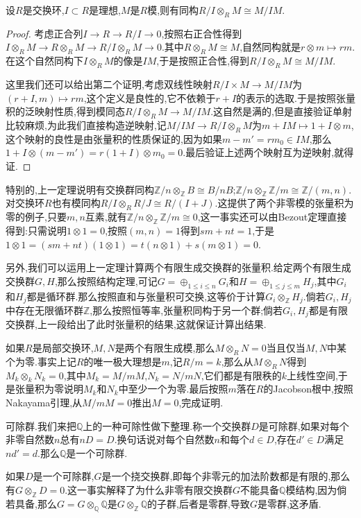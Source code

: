 设$R$是交换环,$I\subset R$是理想,$M$是$R$模,则有同构$R/I\otimes_RM\cong M/IM$.
\begin{proof}
	
	考虑正合列$I\to R\to R/I\to0$,按照右正合性得到$I\otimes_RM\to R\otimes_RM\to R/I\otimes_RM\to0$.其中$R\otimes_RM\cong M$,自然同构就是$r\otimes m\mapsto rm$.在这个自然同构下$I\otimes_RM$的像是$IM$,于是按照正合性,得到$R/I\otimes_RM\cong M/IM$.
	
	这里我们还可以给出第二个证明,考虑双线性映射$R/I\times M\to M/IM$为$(r+I,m)\mapsto rm$,这个定义是良性的,它不依赖于$r+I$的表示的选取.于是按照张量积的泛映射性质,得到模同态$R/I\otimes_RM\to M/IM$.这自然是满的,但是直接验证单射比较麻烦,为此我们直接构造逆映射,记$M/IM\to R/I\otimes_RM$为$m+IM\mapsto1+I\otimes m$,这个映射的良性是由张量积的性质保证的,因为如果$m-m'=rm_0\in IM$,那么$1+I\otimes(m-m')=r(1+I)\otimes m_0=0$.最后验证上述两个映射互为逆映射,就得证.
\end{proof}

特别的,上一定理说明有交换群同构$\mathbb{Z}/n\otimes_{\mathbb{Z}}B\cong B/nB$;$\mathbb{Z}/n\otimes_{\mathbb{Z}}\mathbb{Z}/m\cong\mathbb{Z}/(m,n)$.对交换环$R$也有模同构$R/I\otimes_RR/J\cong R/(I+J)$.这提供了两个非零模的张量积为零的例子,只要$m,n$互素,就有$\mathbb{Z}/n\otimes_{\mathbb{Z}}\mathbb{Z}/m\cong0$,这一事实还可以由Bezout定理直接得到:只需说明$1\otimes1=0$,按照$(m,n)=1$得到$sm+nt=1$,于是$1\otimes1=(sm+nt)(1\otimes1)=t(n\otimes1)+s(m\otimes1)=0$.

另外,我们可以运用上一定理计算两个有限生成交换群的张量积.给定两个有限生成交换群$G,H$,那么按照结构定理,可记$G=\oplus_{1\le i\le n}G_i$和$H=\oplus_{1\le j\le m}H_j$,其中$G_i$和$H_j$都是循环群.那么按照直和与张量积可交换,这等价于计算$G_i\otimes_{\mathbb{Z}}H_j$.倘若$G_i,H_j$中存在无限循环群$\mathbb{Z}$,那么按照恒等率,张量积同构于另一个群;倘若$G_i,H_j$都是有限交换群,上一段给出了此时张量积的结果,这就保证计算出结果.

如果$R$是局部交换环,$M,N$是两个有限生成模,那么$M\otimes_RN=0$当且仅当$M,N$中某个为零.事实上记$R$的唯一极大理想是$m$,记$R/m=k$,那么从$M\otimes_RN$得到$M_k\otimes_kN_k=0$,其中$M_k=M/mM$,$N_k=N/mN$,它们都是有限秩的$k$上线性空间,于是张量积为零说明$M_k$和$N_k$中至少一个为零.最后按照$m$落在$R$的Jacobson根中,按照Nakayama引理,从$M/mM=0$推出$M=0$,完成证明.

可除群.我们来把$\mathbb{Q}$上的一种可除性做下整理.称一个交换群$D$是可除群,如果对每个非零自然数$n$总有$nD=D$.换句话说对每个自然数$n$和每个$d\in D$,存在$d'\in D$满足$nd'=d$.那么$\mathbb{Q}$是一个可除群.

如果$D$是一个可除群,$G$是一个挠交换群,即每个非零元的加法阶数都是有限的,那么有$G\otimes_{\mathbb{Z}}D=0$.这一事实解释了为什么非零有限交换群$G$不能具备$\mathbb{Q}$模结构,因为倘若具备,那么$G=G\otimes_{\mathbb{Q}}\mathbb{Q}$是$G\otimes_{\mathbb{Z}}\mathbb{Q}$的子群,后者是零群,导致$G$是零群,这矛盾.

